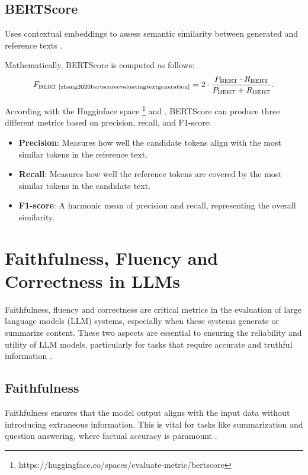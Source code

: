 \subsection{BERTScore \cite{zhang2020bertscoreevaluatingtextgeneration}}

Uses contextual embeddings to assess semantic similarity between generated and reference texts \cite{zhang2020bertscoreevaluatingtextgeneration}.

Mathematically, BERTScore is computed as follows:
\[
F_{\text{BERT \cite{zhang2020bertscoreevaluatingtextgeneration}}} = 2 \cdot \frac{P_{\text{BERT}} \cdot R_{\text{BERT}}}{P_{\text{BERT}} + R_{\text{BERT}}}.
\]

According with the Hugginface space \footnote{https://huggingface.co/spaces/evaluate-metric/bertscore} and \cite{zhang2020bertscoreevaluatingtextgeneration}, BERTScore can produce three different metrics based on precision, recall, and F1-score:
\begin{itemize}
    \item \textbf{Precision}: Measures how well the candidate tokens align with the most similar tokens in the reference text.
    \item \textbf{Recall}: Measures how well the reference tokens are covered by the most similar tokens in the candidate text.
    \item \textbf{F1-score}: A harmonic mean of precision and recall, representing the overall similarity.
\end{itemize}

\section{Faithfulness, Fluency and Correctness in LLMs}

Faithfulness, fluency and correctness are critical metrics in the evaluation of large language models (LLM) systems, especially when these systems generate or summarize content. These two aspects are essential to ensuring the reliability and utility of LLM models, particularly for tasks that require accurate and truthful information \cite{lyu2024faithfulmodelexplanationnlp}.


\subsection{Faithfulness}
Faithfulness ensures that the model output aligns with the input data without introducing extraneous information. This is vital for tasks like summarization and question answering, where factual accuracy is paramount \cite{jacovi-goldberg-2020-towards}.

